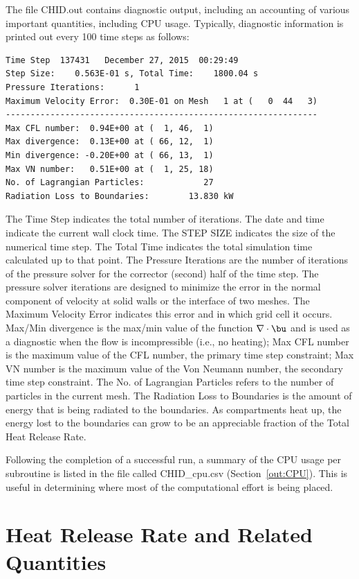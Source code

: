 \documentclass[11pt]{book}
\begin{document}
The file {\ct CHID.out} contains diagnostic output, including an accounting of various important quantities, including CPU usage. Typically, diagnostic information is printed out every 100 time steps as follows:
\begin{lstlisting}
Time Step  137431   December 27, 2015  00:29:49
Step Size:    0.563E-01 s, Total Time:    1800.04 s
Pressure Iterations:      1
Maximum Velocity Error:  0.30E-01 on Mesh   1 at (   0  44   3)
---------------------------------------------------------------
Max CFL number:  0.94E+00 at (  1, 46,  1)
Max divergence:  0.13E+00 at ( 66, 12,  1)
Min divergence: -0.20E+00 at ( 66, 13,  1)
Max VN number:   0.51E+00 at (  1, 25, 18)
No. of Lagrangian Particles:            27
Radiation Loss to Boundaries:        13.830 kW
\end{lstlisting}
The {\ct Time Step} indicates the total number of iterations. The date and time indicate the current wall clock time. The {\ct STEP SIZE} indicates the size of the numerical time step. The {\ct Total Time} indicates the total simulation time calculated up to that point. The {\ct Pressure Iterations} are the number of iterations of the pressure solver for the corrector (second) half of the time step. The pressure solver iterations are designed to minimize the error in the normal component of velocity at solid walls or the interface of two meshes. The {\ct Maximum Velocity Error} indicates this error and in which grid cell it occurs.  {\ct Max/Min divergence} is the max/min value of the function $\nabla \cdot \bu$ and is used as a diagnostic when the flow is incompressible (i.e., no heating); {\ct Max CFL number} is the maximum value of the CFL number, the primary time step constraint; {\ct Max VN number} is the maximum value of the Von Neumann number, the secondary time step constraint. The {\ct No. of Lagrangian Particles} refers to the number of particles in the current mesh. The {\ct Radiation Loss to Boundaries} is the amount of energy that is being radiated to the boundaries. As compartments heat up, the energy lost to the boundaries can grow to be an appreciable fraction of the {\ct Total Heat Release Rate}.

Following the completion of a successful run, a summary of the CPU usage per subroutine is listed in the file called {\ct CHID\_cpu.csv} (Section~\ref{out:CPU}). This is useful in determining where most of the computational effort is being placed.

\section{Heat Release Rate and Related Quantities}
\end{document}
